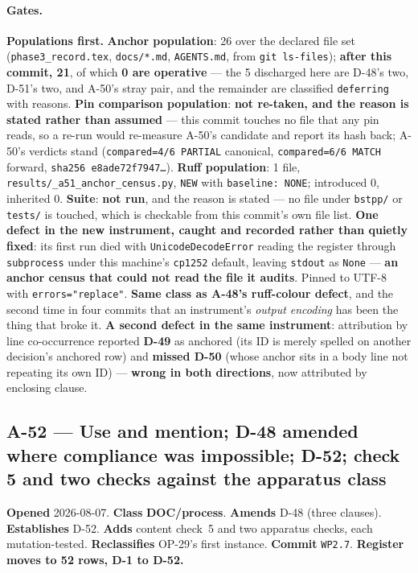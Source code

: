 \documentclass[
  10pt,
]{article}
\begin{document}
\paragraph{Gates.}
\textbf{Populations first.} \textbf{Anchor population}: 26 over the declared file set (\texttt{phase3\_record.tex}, \texttt{docs/*.md}, \texttt{AGENTS.md}, from \texttt{git ls-files}); \textbf{after this commit, 21}, of which \textbf{0 are operative} --- the 5 discharged here are D-48's two, D-51's two, and A-50's stray pair, and the remainder are classified \texttt{deferring} with reasons. \textbf{Pin comparison population}: \textbf{not re-taken, and the reason is stated rather than assumed} --- this commit touches no file that any pin reads, so a re-run would re-measure A-50's candidate and report its hash back; A-50's verdicts stand (\texttt{compared=4/6 PARTIAL} canonical, \texttt{compared=6/6 MATCH} forward, \texttt{sha256 e8ade72f7947\dots}). \textbf{Ruff population}: 1 file, \texttt{results/\allowbreak{}\_a51\_anchor\_census.py}, \texttt{NEW} with \texttt{baseline: NONE}; introduced 0, inherited 0. \textbf{Suite}: \textbf{not run}, and the reason is stated --- no file under \texttt{bstpp/} or \texttt{tests/} is touched, which is checkable from this commit's own file list. \textbf{One defect in the new instrument, caught and recorded rather than quietly fixed}: its first run died with \texttt{UnicodeDecodeError} reading the register through \texttt{subprocess} under this machine's \texttt{cp1252} default, leaving \texttt{stdout} as \texttt{None} --- \textbf{an anchor census that could not read the file it audits}. Pinned to UTF-8 with \texttt{errors="replace"}. \textbf{Same class as A-48's ruff-colour defect}, and the second time in four commits that an instrument's \emph{output encoding} has been the thing that broke it. \textbf{A second defect in the same instrument}: attribution by line co-occurrence reported \textbf{D-49} as anchored (its ID is merely spelled on another decision's anchored row) and \textbf{missed D-50} (whose anchor sits in a body line not repeating its own ID) --- \textbf{wrong in both directions}, now attributed by enclosing clause.

\hypertarget{a-52}{%
\subsection{A-52 --- Use and mention; D-48 amended where compliance was impossible; D-52; check 5 and two checks against the apparatus class}\label{a-52}}

\textbf{Opened} 2026-08-07. \textbf{Class} \textbf{DOC/process}. \textbf{Amends} D-48 (three clauses). \textbf{Establishes} D-52. \textbf{Adds} content check~5 and two apparatus checks, each mutation-tested. \textbf{Reclassifies} OP-29's first instance. \textbf{Commit} \texttt{WP2.7}. \textbf{Register moves to 52 rows, D-1 to D-52.}
\end{document}
